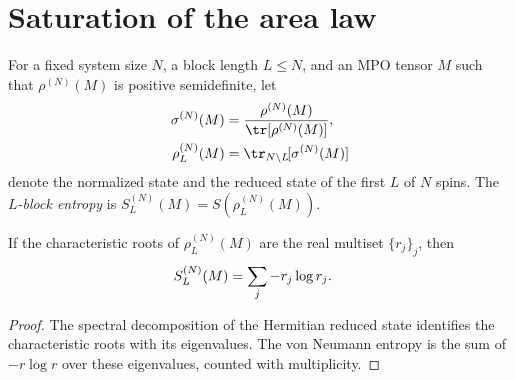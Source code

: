 \section{Saturation of the area law}

\begin{definition}\label{def:block_entropy}
    \leanok
    For a fixed system size $N$, a block length $L\le N$, and an MPO tensor $M$
    such that $\rho^{(N)}(M)$ is positive semidefinite, let
    \begin{align}
        \sigma^{(N)}(M)
         & =\frac{\rho^{(N)}(M)}{\tr[\rho^{(N)}(M)]}, \notag \\
        \rho_L^{(N)}(M)
         & =\tr_{N\setminus L}\![\sigma^{(N)}(M)]
        \notag
    \end{align}
    denote the normalized state and the reduced state of the first $L$ of $N$
    spins. The \emph{$L$-block entropy} is
    $S_L^{(N)}(M)=S(\rho_L^{(N)}(M))$.
\end{definition}

\begin{lemma}
    \label{thm:block_entropy_of_charpoly_roots}
    \leanok
    If the characteristic roots of $\rho_L^{(N)}(M)$ are the real multiset
    $\{r_j\}_j$, then
    \begin{align}
        S_L^{(N)}(M) & =\sum_j -r_j\log r_j. \notag
    \end{align}
\end{lemma}

\begin{proof}
    \leanok
    The spectral decomposition of the Hermitian reduced state identifies the
    characteristic roots with its eigenvalues. The von Neumann entropy is the
    sum of $-r\log r$ over these eigenvalues, counted with multiplicity.
\end{proof}

